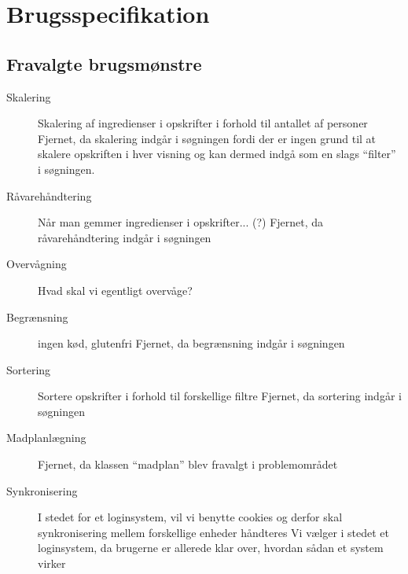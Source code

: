 \section{Brugsspecifikation}
\label{sec:brugsspecifikation}





\subsection{Fravalgte brugsmønstre}
\begin{description}
  \item[Skalering] Skalering af ingredienser i opskrifter i forhold til antallet af personer
Fjernet, da skalering indgår i søgningen fordi der er ingen grund til at skalere opskriften i hver visning og kan dermed indgå som en slags “filter” i søgningen.

\item[Råvarehåndtering] Når man gemmer ingredienser i opskrifter... (?)
Fjernet, da råvarehåndtering indgår i søgningen

\item[Overvågning] Hvad skal vi egentligt overvåge?

\item[Begrænsning] \fx ingen kød, glutenfri
Fjernet, da begrænsning indgår i søgningen

\item[Sortering] Sortere opskrifter i forhold til forskellige filtre
Fjernet, da sortering indgår i søgningen

\item[Madplanlægning] Fjernet, da klassen ``madplan'' blev fravalgt i problemområdet

\item[Synkronisering] I stedet for et loginsystem, vil vi benytte cookies og derfor skal synkronisering mellem forskellige enheder håndteres
Vi vælger i stedet et loginsystem, da brugerne er allerede klar over, hvordan sådan et system virker
  
\end{description}

